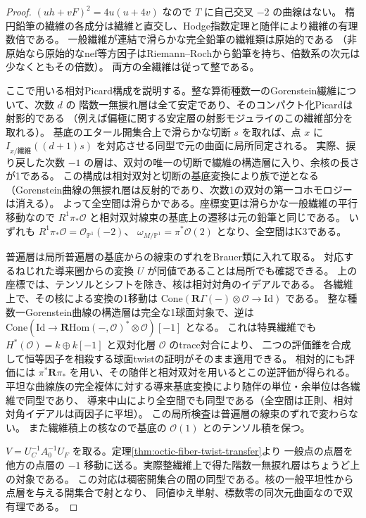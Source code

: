 \begin{proof}
$(uh+vF)^2=4u(u+4v)$ なので $T$ に自己交叉 $-2$ の曲線はない。
楕円鉛筆の繊維の各成分は繊維と直交し、Hodge指数定理と随伴により繊維の有理数倍である。
一般繊維が連結で滑らかな完全鉛筆の繊維類は原始的である
（非原始なら原始的なnef等方因子はRiemann--Rochから鉛筆を持ち、倍数系の次元は少なくともその倍数）。
両方の全繊維は従って整である。

ここで用いる相対Picard構成を説明する。整な算術種数一のGorenstein繊維について、次数 $d$ の
階数一無捩れ層は全て安定であり、そのコンパクト化Picardは射影的である
（例えば偏極に関する安定層の射影モジュライのこの繊維部分を取れる）。
基底のエタール開集合上で滑らかな切断 $s$ を取れば、点 $x$ に
$I_{x/\text{繊維}}((d+1)s)$ を対応させる同型で元の曲面に局所同定される。
実際、捩り戻した次数 $-1$ の層は、双対の唯一の切断で繊維の構造層に入り、余核の長さが1である。
この構成は相対双対と切断の基底変換により族で逆となる
（Gorenstein曲線の無捩れ層は反射的であり、次数1の双対の第一コホモロジーは消える）。
よって全空間は滑らかである。座標変更は滑らかな一般繊維の平行移動なので
$R^1\pi_*\mathcal O$ と相対双対線束の基底上の遷移は元の鉛筆と同じである。
いずれも $R^1\pi_*\mathcal O=\mathcal O_{\mathbb P^1}(-2)$、
$\omega_{M/\mathbb P^1}=\pi^*\mathcal O(2)$ となり、全空間はK3である。

普遍層は局所普遍層の基底からの線束のずれをBrauer類に入れて取る。
対応するねじれた導来圏からの変換 $U$ が同値であることは局所でも確認できる。
上の座標では、テンソルとシフトを除き、核は相対対角のイデアルである。
各繊維上で、その核による変換の1移動は
$\mathrm{Cone}(\mathbf R\Gamma(-)\otimes\mathcal O\to\mathrm{Id})$ である。
整な種数一Gorenstein曲線の構造層は完全な1球面対象で、逆は
$\mathrm{Cone}(\mathrm{Id}\to\mathbf R\mathrm{Hom}(-,\mathcal O)^*\otimes\mathcal O)[-1]$ となる。
これは特異繊維でも $H^*(\mathcal O)=k\oplus k[-1]$ と双対化層 $\mathcal O$ のtrace対合により、
二つの評価錐を合成して恒等因子を相殺する球面twistの証明がそのまま適用できる。
相対的にも評価には $\pi^*\mathbf R\pi_*$ を用い、その随伴と相対双対を用いるとこの逆評価が得られる。
平坦な曲線族の完全複体に対する導来基底変換により随伴の単位・余単位は各繊維で同型であり、
導来中山により全空間でも同型である（全空間は正則、相対対角イデアルは両因子に平坦）。
この局所検査は普遍層の線束のずれで変わらない。
また繊維積上の核なので基底の $\mathcal O(1)$ とのテンソル積を保つ。

$V=U_C^{-1}A_0^{-1}U_F$ を取る。定理\ref{thm:octic-fiber-twist-transfer}より
一般点の点層を他方の点層の $-1$ 移動に送る。実際整繊維上で得た階数一無捩れ層はちょうど上の対象である。
この対応は稠密開集合の間の同型である。核の一般平坦性から点層を与える開集合で射となり、
同値ゆえ単射、標数零の同次元曲面なので双有理である。


\end{proof}
